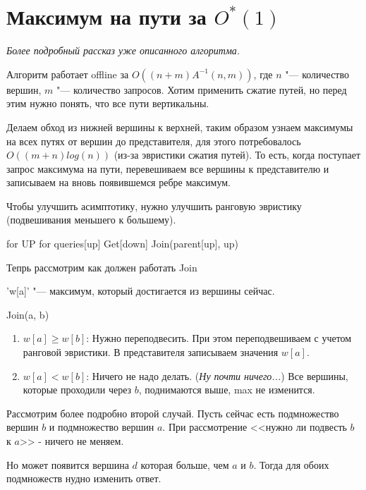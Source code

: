 \section{Максимум на пути за \texorpdfstring{$O^*(1)$}{O*(1)}}

\textit{Более подробный рассказ уже описанного алгоритма.}

Алгоритм работает offline за $O((n+m)A^{-1}(n, m))$, где $n$ "--- количество вершин, $m$ "--- количество запросов.
Хотим применить сжатие путей, но перед этим нужно понять, что все пути вертикальны.


Делаем обход из нижней вершины к верхней, таким образом узнаем максимумы на всех путях от вершин до представителя, для этого потребовалось $O((m + n)log(n))$
(из-за эвристики сжатия путей).
То есть, когда поступает запрос максимума на пути, перевешиваем все вершины к представителю и записываем на вновь появившемся ребре максимум. 

Чтобы улучшить асимптотику, нужно улучшить ранговую эвристику (подвешивания меньшего к большему).


\begin{cppcode}
for UP
	for queries[up]
		Get[down]
Join(parent[up], up)
\end{cppcode}

Тепрь рассмотрим как должен работать Join

\cpp'w[a]' "--- максимум, который достигается из вершины сейчас.


Join(a, b)
\begin{enumerate}
\item
	$w[a] \ge w[b]$:
	Нужно переподвесить. При этом переподвешиваем с учетом ранговой эвристики. 
	В представителя записываем значения $w[a]$.

\item
	$w[a] < w[b]$:
	Ничего не надо делать. (\textit{Ну почти ничего...})
	Все вершины, которые проходили через $b$, поднимаются выше, max не изменится.
\end{enumerate}

Рассмотрим более подробно второй случай.
Пусть сейчас есть подмножество вершин $b$ и подмножество вершин $a$.
При рассмотрение <<нужно ли подвесть $b$ к $a$>> - ничего не меняем.

Но может появится вершина $d$ которая больше, чем $a$ и $b$. Тогда для обоих подмножеств нудно изменить ответ.

